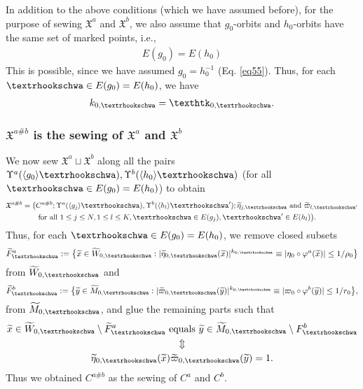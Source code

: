 \documentclass[12pt,a4paper,notitlepage]{article}
\theoremstyle{definition}
\theoremstyle{plain}
\newcommand{\fk}{\mathfrak}
\newcommand{\wtd}{\widetilde}
\newcommand{\bk}[1]{\langle {#1}\rangle}
\newcommand{\tipae}{\text{\textrhookschwa}}
\newcommand{\tipak}{\text{\texthtk}}
\numberwithin{equation}{subsection}
\begin{document}
In addition to the above conditions (which we have assumed before), for the purpose of sewing $\fk X^a$ and $\fk X^b$, we also assume that $g_0$-orbits and $h_0$-orbits have the same set of marked points, i.e.,
\begin{align}
\boxed{~E(g_0)=E(h_0)~}
\end{align} 
This is possible, since we have assumed $g_0=h_0^{-1}$ (Eq. \eqref{eq55}). Thus, for each $\tipae\in E(g_0)=E(h_0)$, we have
\begin{align*}
k_{0,\tipae}=\tipak_{0,\tipae}.	
\end{align*}



\subsubsection{$\fk X^{a\#b}$ is the sewing of $\fk X^a$ and $\fk X^b$}\label{lb43}



We now sew $\fk X^a\sqcup\fk X^b$ along all the pairs $\Upsilon^a(\bk{g_0}\tipae),\Upsilon^b(\bk{h_0}\tipae)$ (for all $\tipae\in E(g_0)=E(h_0)$) to obtain
\begin{align*}
\fk X^{a\#b}=	\big(&C^{a\#b};\Upsilon^a(\bk{g_j}\tipae),\Upsilon^b(\bk{h_l}\tipae');\wtd\eta_{j,\tipae}\text{ and }\wtd\varpi_{l,\tipae'}\nonumber\\
&\text{ for all }1\leq j\leq N,1\leq l\leq K,\tipae\in E(g_j),\tipae'\in E(h_l)\big).	
\end{align*}
Thus, for each $\tipae\in E(g_0)=E(h_0)$, we remove closed subsets
\begin{align*}
\wtd F_\tipae^a:=\big\{\wtd x\in\wtd W_{0,\tipae}:|\wtd\eta_{0,\tipae}(\wtd x)|^{k_{0,\tipae}}\equiv|\eta_0\circ\varphi^a(\wtd x)|\leq 1/\rho_0\big\}
\end{align*}
from $\wtd W_{0,\tipae}$ and 
\begin{align*}
\wtd F_\tipae^b:=\big\{\wtd y\in\wtd M_{0,\tipae}:|\wtd\varpi_{0,\tipae}(\wtd y)|^{k_{0,\tipae}}\equiv|\varpi_0\circ\varphi^b(\wtd y)|\leq 1/r_0\big\},
\end{align*}
from $\wtd M_{0,\tipae}$, and glue the remaining parts such that
\begin{gather*}
\wtd x\in \wtd W_{0,\tipae}\setminus \wtd F_\tipae^a\text{ equals }\wtd y\in \wtd M_{0,\tipae}\setminus F_\tipae^b\\
\Updownarrow\\
\wtd \eta_{0,\tipae}(\wtd x)\wtd\varpi_{0,\tipae}(\wtd y)=1.
\end{gather*}
Thus we obtained $C^{a\#b}$ as the sewing of $C^a$ and $C^b$.
\end{document}
